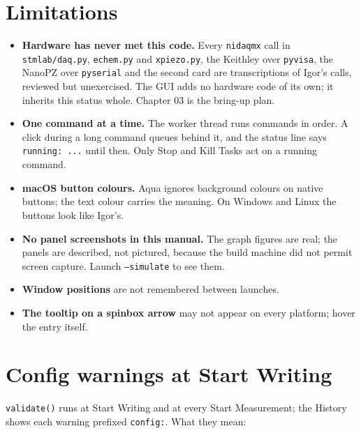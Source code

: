 \section{Limitations}

\begin{itemize}[leftmargin=*]
\item \textbf{Hardware has never met this code.} Every \texttt{nidaqmx} call in \texttt{stmlab/\discretionary{}{}{}daq.\discretionary{}{}{}py}, \texttt{echem.\discretionary{}{}{}py} and \texttt{xpiezo.\discretionary{}{}{}py}, the Keithley over \texttt{pyvisa}, the NanoPZ over \texttt{pyserial} and the second card are transcriptions of Igor's calls, reviewed but unexercised. The GUI adds no hardware code of its own; it inherits this status whole. Chapter 03 is the bring-up plan.
\item \textbf{One command at a time.} The worker thread runs commands in order. A click during a long command queues behind it, and the status line says \texttt{running: .\discretionary{}{}{}.\discretionary{}{}{}.\discretionary{}{}{}} until then. Only Stop and Kill Tasks act on a running command.
\item \textbf{macOS button colours.} Aqua ignores background colours on native buttons; the text colour carries the meaning. On Windows and Linux the buttons look like Igor's.
\item \textbf{No panel screenshots in this manual.} The graph figures are real; the panels are described, not pictured, because the build machine did not permit screen capture. Launch \texttt{--simulate} to see them.
\item \textbf{Window positions} are not remembered between launches.
\item \textbf{The tooltip on a spinbox arrow} may not appear on every platform; hover the entry itself.
\end{itemize}

\section{Config warnings at Start Writing}

\texttt{validate()} runs at Start Writing and at every Start Measurement; the History shows each warning prefixed \texttt{config:}. What they mean:

